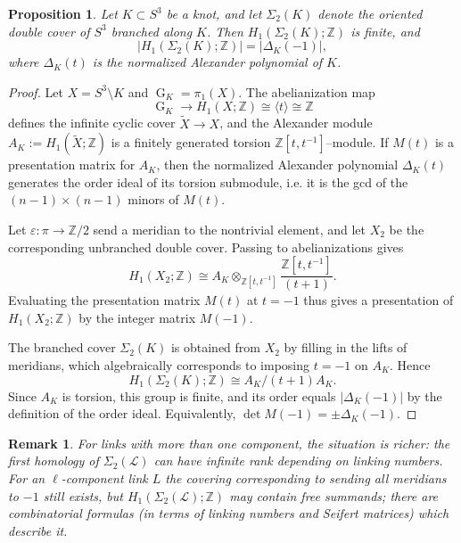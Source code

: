 \documentclass[table]{amsart}
\newtheorem{remark}[theorem]{Remark}
\newtheorem{proposition}[theorem]{Proposition}
\newcommand{\Z}{\mathbb{Z}}
\newcommand{\cL}{\mathcal{L}}
\newcommand{\cover}{\Sigma_2}
\newcommand{\op}[1]{\operatorname{#1}}
\numberwithin{equation}{section}
\begin{document}

\begin{proposition}\label{order of H1}
Let $K\subset S^3$ be a knot, and let $\Sigma_2(K)$ denote the oriented double cover of $S^3$ branched along $K$. Then $H_1(\Sigma_2(K);\mathbb{Z})$ is finite, and 
\[
|H_1(\Sigma_2(K);\mathbb{Z})| = |\Delta_K(-1)|,
\]
where $\Delta_K(t)$ is the normalized Alexander polynomial of $K$.
\end{proposition}

\begin{proof}
Let $X = S^3 \setminus K$ and $\op{G}_K = \pi_1(X)$. The abelianization map 
\[
\op{G}_K \to H_1(X;\mathbb{Z}) \cong \langle t \rangle \cong \mathbb{Z}
\]
defines the infinite cyclic cover $\widetilde{X}\to X$, and the Alexander module
$A_K := H_1(\widetilde{X};\mathbb{Z})$ is a finitely generated torsion $\mathbb{Z}[t,t^{-1}]$–module.  
If $M(t)$ is a presentation matrix for $A_K$, then the normalized Alexander polynomial $\Delta_K(t)$ generates the order ideal of its torsion submodule, i.e. it is the gcd of the $(n-1)\times(n-1)$ minors of $M(t)$.

Let $\varepsilon:\pi\to\mathbb{Z}/2$ send a meridian to the nontrivial element, and let $X_2$ be the corresponding unbranched double cover.  Passing to abelianizations gives
\[
H_1(X_2;\mathbb{Z}) \cong A_K \otimes_{\mathbb{Z}[t,t^{-1}]} 
\frac{\mathbb{Z}[t,t^{-1}]}{(t+1)}.
\]
Evaluating the presentation matrix $M(t)$ at $t=-1$ thus gives a presentation of $H_1(X_2;\mathbb{Z})$ by the integer matrix $M(-1)$.

The branched cover $\Sigma_2(K)$ is obtained from $X_2$ by filling in the lifts of meridians, which algebraically corresponds to imposing $t=-1$ on $A_K$. Hence
\[
H_1(\Sigma_2(K);\mathbb{Z}) \cong A_K/(t+1)A_K.
\]
Since $A_K$ is torsion, this group is finite, and its order equals $|\Delta_K(-1)|$ by the definition of the order ideal.  Equivalently, $\det M(-1)=\pm\Delta_K(-1)$.
\end{proof}



\begin{remark}
For links with more than one component, the situation is richer: the first homology of \(\cover(\cL)\) can have infinite rank depending on linking numbers. For an $\ell$-component link \(L\) the covering corresponding to sending all meridians to \(-1\) still exists, but \(H_1(\cover(\cL);\Z)\) may contain free summands; there are combinatorial formulas (in terms of linking numbers and Seifert matrices) which describe it.
\end{remark}
\end{document}
